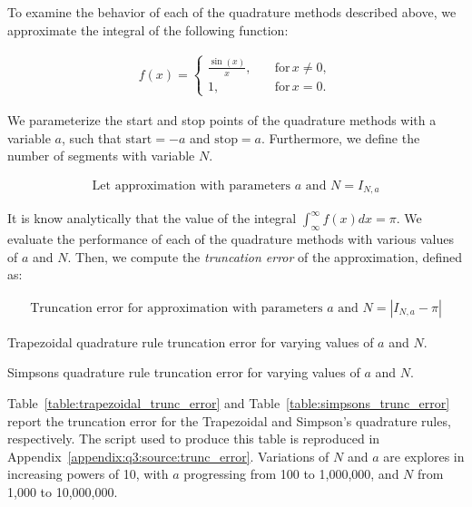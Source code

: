 \documentclass[10pt]{article}
\begin{document}
    To examine the behavior of each of the quadrature methods described above, we approximate the integral of the following function:

    \begin{gather*}
        f(x) =
        \begin{cases}
            \frac{\sin{(x)}}{x}, & \quad \text{for} \, x \neq 0, \\
            1, & \quad \text{for} \, x = 0.
        \end{cases}
    \end{gather*}

    We parameterize the start and stop points of the quadrature methods with a variable $a$, such that ${\text{start} = -a}$ and ${\text{stop} = a}$. Furthermore, we define the number of segments with variable $N$.

    \begin{gather*}
        \text{Let approximation with parameters $a$ and $N$} = I_{N,a}
    \end{gather*}

    It is know analytically that the value of the integral $\int_\infty^\infty f(x) dx = \pi$. We evaluate the performance of each of the quadrature methods with various values of $a$ and $N$. Then, we compute the \textit{truncation error} of the approximation, defined as:

    \begin{gather*}
        \text{Truncation error for approximation with parameters $a$ and $N$} = \left| I_{N,a} - \pi \right|
    \end{gather*}

    \begin{table}[h]
        \centering
        \caption{Trapezoidal quadrature rule truncation error for varying values of $a$ and $N$.}
        \label{table:trapezoidal_trunc_error}
    \end{table}

    \begin{table}[h]
        \centering
        \caption{Simpsons quadrature rule truncation error for varying values of $a$ and $N$.}
        \label{table:simpsons_trunc_error}
    \end{table}

    Table~\ref{table:trapezoidal_trunc_error} and Table~\ref{table:simpsons_trunc_error} report the truncation error for the Trapezoidal and Simpson's quadrature rules, respectively. The script used to produce this table is reproduced in Appendix~\ref{appendix:q3:source:trunc_error}. Variations of $N$ and $a$ are explores in increasing powers of 10, with $a$ progressing from 100 to 1,000,000, and $N$ from 1,000 to 10,000,000.
\end{document}
